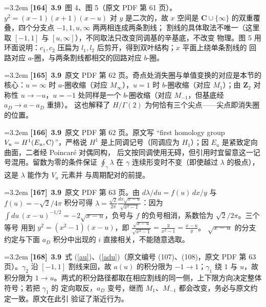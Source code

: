 \par
\par\medskip\noindent\hangindent=3.2em \textbf{[164]}~\textbf{3.9}~图 4、图 5（原文 PDF 第 61 页）。$y^2=(x-1)(x+1)(x-u)$ 对 $y$ 是二次的，故  $x$ 空间是 $\mathbf{C}\cup\{\infty\}$ 的双重覆叠，四个分支点 $-1,1,u,\infty$ 两两相连成两条割线；  割线的具体取法不唯一（这里取 $[-1,1]$ 与 $[u,\infty]$），不同取法只改变同调基的辛基底，不改变  物理。图 5 用环面说明：$c_1,c_2$ 压扁为 $l_1,l_2$ 后剪开，得到双叶结构；$x$ 平面上绕单条割线的  回路对应 $a$-圈，与两条割线都相交的回路对应 $b$-圈。
\par
\par\medskip\noindent\hangindent=3.2em \textbf{[165]}~\textbf{3.9}~原文 PDF 第 62 页。奇点处消失圈与单值变换的对应是本节的核心：$u=\infty$ 时  $a$-圈收缩（对应 $M_\infty$），$u=1$ 时 $b$-圈收缩（对应 $M_1$）；由 $\mathbf{Z}_2$ 对称性  $u\to-u$，$u=-1$ 处同样是一个 $b$-圈收缩（对应 $M_{-1}$，但基底经 $a_D\to a-a_D$ 重排）。  这也解释了 $H/\Gamma(2)$ 为何恰有三个尖点——尖点即消失圈的位置。
\par
\par\medskip\noindent\hangindent=3.2em \textbf{[166]}~\textbf{3.9}~原文 PDF 第 62 页。原文写 “first homology group $V_u=H^1(E_u,{\rm C})$”，严格说  $H^1$ 是上同调记号（同调应为 $H_1$）；因 $E_u$ 是紧致定向曲面，二者经 Poincaré 对偶同构，  后文按同调使用无碍，但引用时宜留意这一记号混用。留数为零的条件保证 $\oint_\gamma\lambda$  在 $\gamma$ 连续形变时不变（即使越过 $\lambda$ 的极点），这是 $\lambda$ 能作为 $V_u$ 元素并  与周期配对的前提。
\par
\par\medskip\noindent\hangindent=3.2em \textbf{[167]}~\textbf{3.9}~原文 PDF 第 63 页。由 $d\lambda/du=f(u)\,dx/y$ 与 $f(u)=-\sqrt2/4\pi$ 积分可得  $\lambda=\frac{\sqrt2}{2\pi}\frac{dx\sqrt{x-u}}{\sqrt{x^2-1}}$：因为  $\int du\,(x-u)^{-1/2}=-2\sqrt{x-u}$，负号与 $f$ 的负号相消，系数恰为 $\sqrt2/2\pi$。三个等号  用到 $y^2=(x^2-1)(x-u)$，即 $\frac{\sqrt{x-u}}{\sqrt{x^2-1}}=\frac{y}{x^2-1}=\frac{x-u}{y}$。  $\sqrt{x-u}$ 的分支约定与下面 $a_D$ 积分中出现的 $i$ 直接相关，不能随意选取。
\par
\par\medskip\noindent\hangindent=3.2em \textbf{[168]}~\textbf{3.9}~式 (\ref{au})、(\ref{adu})（原文编号 (107)、(108)，原文 PDF 第 63 页）。$\gamma_2$  沿 $[-1,1]$ 割线来回，故 $a(u)$ 的积分限为 $-1\to 1$；$\gamma_1$ 绕 $1$ 与 $u$，故积分限为  $1\to u$。两式的积分路径都取在相应割线的同一侧，上下限方向决定整体符号；若把 $\gamma_1$ 的  定向取反，$a_D$ 变号，继而 $M_1$、$M_{-1}$ 都会改变，务必与原文约定一致。原文在此引 \cite{SW-I}  验证了渐近行为。
